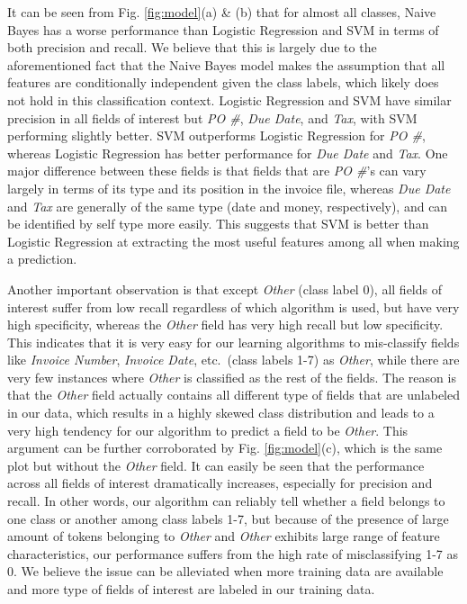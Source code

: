 It can be seen from Fig. \ref{fig:model}(a) \& (b) that for almost all classes,  Naive Bayes has a worse performance than Logistic Regression and SVM in terms of both precision and recall.  We believe that this is largely due to the aforementioned fact that the Naive Bayes model makes the assumption that all features are conditionally independent given the class labels, which likely does not hold in this classification context. Logistic Regression and SVM have similar precision in all fields of interest but \textit{PO \#}, \textit{Due Date}, and \textit{Tax}, with SVM performing slightly better. SVM outperforms Logistic Regression for \textit{PO \#}, whereas Logistic Regression has better performance for \textit{Due Date} and \textit{Tax}. One major difference between these fields is that fields that are \textit{PO \#}'s can vary largely in terms of its type and its position in the invoice file, whereas \textit{Due Date} and \textit{Tax} are generally of the same type (date and money, respectively), and can be identified by self type more easily.  This suggests that SVM is better than Logistic Regression at extracting the most useful features among all when making a prediction.

Another important observation is that except \textit{Other} (class label 0), all fields of interest suffer from low recall regardless of which algorithm is used, but have very high specificity, whereas the \textit{Other} field has very high recall but low specificity. This indicates that it is very easy for our learning algorithms to mis-classify fields like \textit{Invoice Number}, \textit{Invoice Date}, etc.\ (class labels 1-7) as \textit{Other},  while there are very few instances where \textit{Other} is classified as the rest of the fields. The reason is that the \textit{Other} field actually contains all different type of fields that are unlabeled in our data, which results in a highly skewed class distribution and leads to a very high tendency for our algorithm to predict a field to be \textit{Other}. This argument can be further corroborated by Fig. \ref{fig:model}(c), which is the same plot but without the \textit{Other} field. It can easily be seen that the performance across all fields of interest dramatically increases, especially for precision and recall. In other words, our algorithm can reliably tell whether a field belongs to one class or another among class labels 1-7, but because of the presence of large amount of tokens belonging to \textit{Other} and \textit{Other} exhibits large range of feature characteristics, our performance suffers from the high rate of misclassifying 1-7 as 0. We believe the issue can be alleviated when more training data are available and more type of fields of interest are labeled in our training data.

